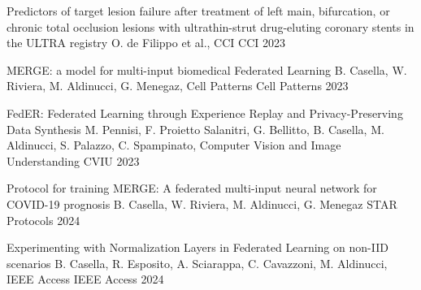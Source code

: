 \begin{cvhonors}


  \cvhonor
    {Predictors of target lesion failure after treatment of left main, bifurcation, or chronic total occlusion lesions with ultrathin-strut drug-eluting coronary stents in the ULTRA registry} %
    {O. de Filippo et al., CCI} %
    {CCI} %
    {2023} %

  \cvhonor
    {MERGE: a model for multi-input biomedical Federated Learning} %
    {B. Casella, W. Riviera, M. Aldinucci, G. Menegaz, Cell Patterns} %
    {Cell Patterns} %
    {2023} %

  \cvhonor
    {FedER: Federated Learning through Experience Replay and Privacy-Preserving Data Synthesis} %
    {M. Pennisi, F. Proietto Salanitri, G. Bellitto, B. Casella, M. Aldinucci, S. Palazzo, C. Spampinato, Computer Vision and Image Understanding} %
    {CVIU} %
    {2023} %


	\cvhonor
    {Protocol for training MERGE: A federated multi-input neural network for COVID-19 prognosis} %
    {B. Casella, W. Riviera, M. Aldinucci, G. Menegaz} %
    {STAR Protocols} %
    {2024} %

  \cvhonor
    {Experimenting with Normalization Layers in Federated Learning on non-IID scenarios} %
    {B. Casella, R. Esposito, A. Sciarappa, C. Cavazzoni, M. Aldinucci, IEEE Access} %
    {IEEE Access} %
    {2024} %
    
\end{cvhonors}



